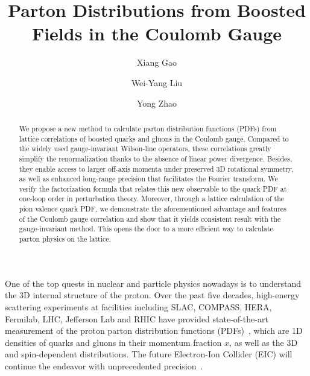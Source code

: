 \documentclass[prd,twocolumn,preprintnumbers,showpacs,nofootinbib,superscriptaddress,notitlepage,floatfix]{revtex4-1}
\begin{document}
\title{Parton Distributions from Boosted Fields in the Coulomb Gauge}


\author{Xiang Gao}

\author{Wei-Yang Liu}

\author{Yong Zhao}

\begin{abstract}
We propose a new method to calculate parton distribution functions (PDFs) from lattice correlations of boosted quarks and gluons in the Coulomb gauge.
Compared to the widely used gauge-invariant Wilson-line operators, these correlations greatly simplify the renormalization thanks to the absence of linear power divergence. Besides, they enable access to larger off-axis momenta under preserved 3D rotational symmetry, as well as enhanced long-range precision that facilitates the Fourier transform.
We verify the factorization formula that relates this new observable to the quark PDF at one-loop order in perturbation theory.
Moreover, through a lattice calculation of the pion valence quark PDF, we demonstrate the aforementioned advantage and features of the Coulomb gauge correlation and show that it yields consistent result with the gauge-invariant method.
This opens the door to a more efficient way to calculate parton physics on the lattice.
\end{abstract}

\maketitle

One of the top quests in nuclear and particle physics nowadays is to understand the 3D internal structure of the proton.
Over the past five decades, high-energy scattering experiments at facilities including SLAC, COMPASS, HERA, Fermilab, LHC, Jefferson Lab and RHIC have provided state-of-the-art measurement of the proton parton distribution functions (PDFs)~\cite{ParticleDataGroup:2022pth}, which are 1D densities of quarks and gluons in their momentum fraction $x$, as well as the 3D and spin-dependent distributions. The future Electron-Ion Collider (EIC) will continue the endeavor with unprecedented precision~\cite{Accardi:2012qut,AbdulKhalek:2021gbh}.
\end{document}
